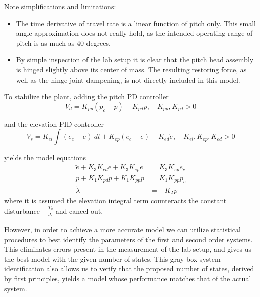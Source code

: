 Note simplifications and limitations:
\begin{itemize}
	\item{The time derivative of travel rate is a linear function of pitch only. This small angle approximation does not really hold, as the intended operating range of pitch is as much as $40$ degrees.}
	\item{By simple inspection of the lab setup it is clear that the pitch head assembly is hinged slightly above its center of mass. The resulting restoring force, as well as the hinge joint dampening, is not directly included in this model.}
\end{itemize}

To stabilize the plant, adding the pitch PD controller
\begin{equation*}
	V_d = K_{pp} (p_c - p) - K_{pd} \dot{p}, \quad K_{pp}, K_{pd} > 0
\end{equation*}

and the elevation PID controller
\begin{equation*}
	V_s = K_{ei} \int (e_c - e) \ dt +  K_{ep} (e_c - e) - K_{ed} \dot{e}, \quad K_{ei}, K_{ep}, K_{ed} > 0
\end{equation*}

yields the model equations
\begin{subequations}
\label{eq:model}
\begin{align}
	\ddot{e} + K_{3} K_{ed} \dot{e} + K_{3} K_{ep} e &= K_{3} K_{ep} e_{c} \label{eq:model_se_al_elev} \\
	\ddot{p} + K_{1} K_{pd} \dot{p} + K_{1} K_{pp} p &= K_{1} K_{pp} p_{c} \label{eq:model_se_al_pitch} \\
	\ddot{\lambda} &= -K_{2} p \label{eq:model_se_al_r} 
\end{align}
\end{subequations}
where it is assumed the elevation integral term counteracts the constant disturbance $-\frac{T_g}{J_e}$ and cancel out.

However, in order to achieve a more accurate model we can utilize statistical procedures to best identify the parameters of the first and second order systems. This eliminates errors present in the measurement of the lab setup, and gives us the best model with the given number of states. This gray-box system identification also allows us to verify that the proposed number of states, derived by first principles, yields a model whose performance matches that of the actual system.

